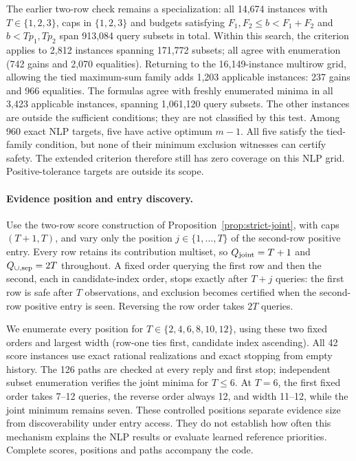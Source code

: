 The earlier two-row check remains a specialization: all 14,674 instances with $T\in\{1,2,3\}$, caps in $\{1,2,3\}$ and budgets satisfying $F_1,F_2\le b<F_1+F_2$ and $b<Tp_1,Tp_2$ span 913,084 query subsets in total. Within this search, the criterion applies to 2,812 instances spanning 171,772 subsets; all agree with enumeration (742 gains and 2,070 equalities). Returning to the 16,149-instance multirow grid, allowing the tied maximum-sum family adds 1,203 applicable instances: 237 gains and 966 equalities. The formulas agree with freshly enumerated minima in all 3,423 applicable instances, spanning 1,061,120 query subsets. The other instances are outside the sufficient conditions; they are not classified by this test. Among 960 exact NLP targets, five have active optimum $m-1$. All five satisfy the tied-family condition, but none of their minimum exclusion witnesses can certify safety. The extended criterion therefore still has zero coverage on this NLP grid. Positive-tolerance targets are outside its scope.


\paragraph{Evidence position and entry discovery.}
\label{app:entry-placement}
Use the two-row score construction of Proposition~\ref{prop:strict-joint}, with caps $(T+1,T)$, and vary only the position $j\in\{1,\ldots,T\}$ of the second-row positive entry. Every row retains its contribution multiset, so $Q_{\rm joint}=T+1$ and $Q_{\cup,\rm sep}=2T$ throughout. A fixed order querying the first row and then the second, each in candidate-index order, stops exactly after $T+j$ queries: the first row is safe after $T$ observations, and exclusion becomes certified when the second-row positive entry is seen. Reversing the row order takes $2T$ queries.

We enumerate every position for $T\in\{2,4,6,8,10,12\}$, using these two fixed orders and largest width (row-one ties first, candidate index ascending). All 42 score instances use exact rational realizations and exact stopping from empty history. The 126 paths are checked at every reply and first stop; independent subset enumeration verifies the joint minima for $T\le6$. At $T=6$, the first fixed order takes 7--12 queries, the reverse order always 12, and width 11--12, while the joint minimum remains seven. These controlled positions separate evidence size from discoverability under entry access. They do not establish how often this mechanism explains the NLP results or evaluate learned reference priorities. Complete scores, positions and paths accompany the code.


